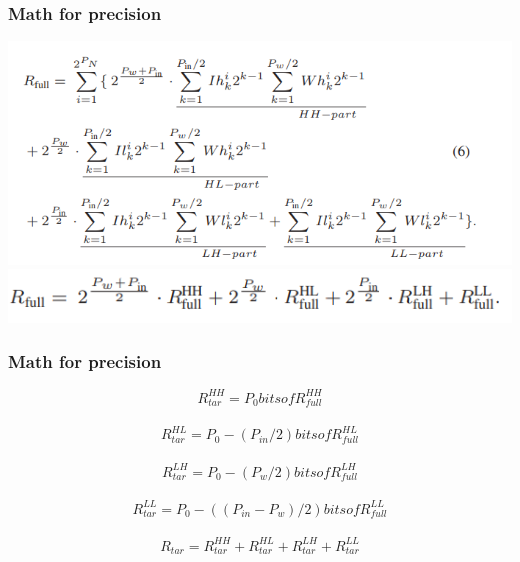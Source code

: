 \documentclass[hyperref={colorlinks}]{beamer}
\begin{document}
\begin{frame}
	\frametitle{Math for precision}
	\begin{center}
		\includegraphics[scale=0.4]{expandRfull.png}\\
		\includegraphics[scale=0.4]{Rfull_again.png}\\
	\end{center}
\end{frame}
\begin{frame}
	\frametitle{Math for precision}
	\begin{center}
		\[ R_{tar}^{HH} = P_0 bits of R_{full}^{HH}\]\\
		\[ R_{tar}^{HL} = P_0 - (P_{in}/2) bits of R_{full}^{HL}\]\\
		\[ R_{tar}^{LH} = P_0 - (P_{w}/2) bits of R_{full}^{LH}\]\\
		\[ R_{tar}^{LL} = P_0 - ((P_{in} - P_{w})/2) bits of R_{full}^{LL}\]\\
		\[ R_{tar} = R_{tar}^{HH} + R_{tar}^{HL} + R_{tar}^{LH} + R_{tar}^{LL}\]
	\end{center}
\end{frame}
\end{document}
